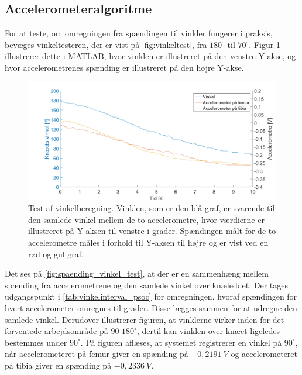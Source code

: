 \subsection{Accelerometeralgoritme}

For at teste, om omregningen fra spændingen til vinkler fungerer i praksis, bevæges vinkeltesteren, der er vist på \autoref{fig:vinkeltest}, fra $180^{\circ}$ til $70^{\circ}$. 
Figur \ref{fig:spaending_vinkel_test} illustrerer dette i MATLAB, hvor vinklen er illustreret på den venstre Y-akse, og hvor accelerometrenes spænding er illustreret på den højre Y-akse.

\begin{figure}[H]
\centering
\includegraphics[width=1\textwidth]{figures/spaending_vinkel_test}
\caption{Test af vinkelberegning. Vinklen, som er den blå graf, er svarende til den samlede vinkel mellem de to accelerometre, hvor værdierne er illustreret på Y-aksen til venstre i grader. Spændingen målt for de to accelerometre måles i forhold til Y-aksen til højre og er vist ved en rød og gul graf.}
\label{fig:spaending_vinkel_test}
\end{figure}

\noindent
Det ses på \autoref{fig:spaending_vinkel_test}, at der er en sammenhæng mellem spænding fra accelerometrene og den samlede vinkel over knæleddet. 
Der tages udgangspunkt i \autoref{tab:vinkelinterval_psoc} for omregningen, hvoraf spændingen for hvert accelerometer omregnes til grader. 
Disse lægges sammen for at udregne den samlede vinkel. 
Derudover illustrerer figuren, at vinklerne virker inden for det forventede arbejdsområde på $90$-$180^{\circ}$, dertil kan vinklen over knæet ligeledes bestemmes under $90^{\circ}$. 
På figuren aflæses, at systemet registrerer en vinkel på $90^{\circ}$, når  accelerometeret på femur giver en spænding på $-0,2191~V$ og accelerometeret på tibia giver en spænding på $-0,2336~V$. 

